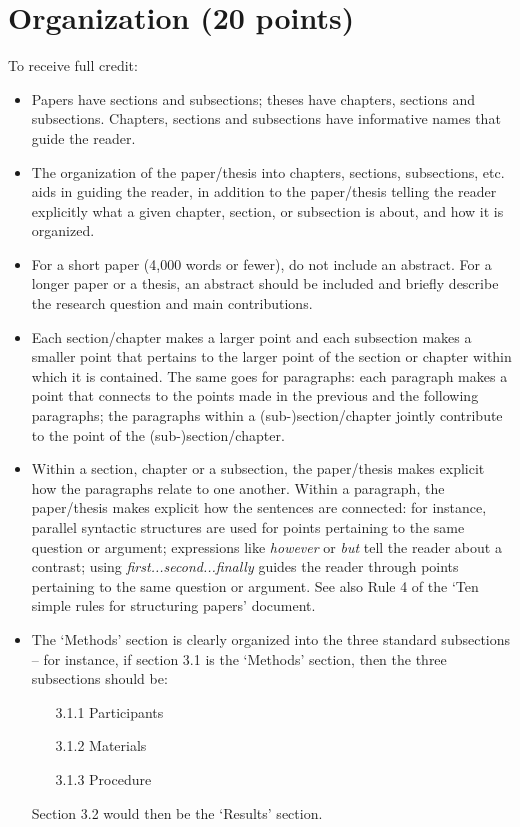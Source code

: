 \documentclass[11pt,fleqn,a4paper/thesis]{article}
\newcommand{\6}{\mbox{$[\hspace*{-.6mm}[$}}
\newcommand{\9}{\mbox{$]\hspace*{-.6mm}]$}}
\begin{document}
\section{Organization (20 points)}

To receive full credit:

\begin{itemize}[itemsep=-1pt,leftmargin=2.5ex,topsep=-2pt]

\item Papers have sections and subsections; theses have chapters, sections and subsections. Chapters, sections and subsections have informative names that guide the reader.

\item The organization of the paper/thesis into chapters, sections, subsections, etc. aids in guiding the reader, in addition to the paper/thesis telling the reader explicitly what a given chapter, section, or subsection is about, and how it is organized.

\item For a short paper (4,000 words or fewer), do not include an abstract. For a longer paper or a thesis, an abstract should be included and briefly describe the research question and main contributions.

\item Each section/chapter makes a larger point and each subsection makes a smaller point that pertains to the larger point of the section or chapter within
which it is contained. The same goes for paragraphs: each paragraph makes a point that connects to the points made in the previous and the following
paragraphs; the paragraphs within a (sub-)section/chapter jointly contribute to the point of the (sub-)section/chapter.

\item Within a section, chapter or a subsection, the paper/thesis makes explicit how the paragraphs relate to one another. Within a paragraph, the paper/thesis makes explicit how the sentences are connected: for instance, parallel syntactic structures are used for points pertaining to the same question or argument; expressions like {\em however} or {\em but} tell the reader about a contrast; using {\em first...second...finally} guides the reader through points pertaining to the same question or argument. See also Rule 4 of the `Ten simple rules for structuring papers' document.

\item The `Methods' section is clearly organized into the three standard subsections -- for instance, if section 3.1 is the `Methods' section, then the three subsections should be:

\begin{itemize}
\item[3.1.1] Participants
\item[3.1.2] Materials
\item[3.1.3] Procedure
\end{itemize}

Section 3.2 would then be the `Results' section.

\end{itemize}
\end{document}
